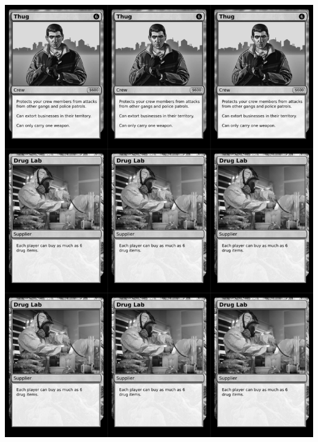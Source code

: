 \documentclass[a4paper]{article}
\begin{document}
\newpage

\begin{center}
	\centering
	\includegraphics[width=200.5mm,height=280.7mm]{output/temp/page19.png}
\end{center}
\end{document}
